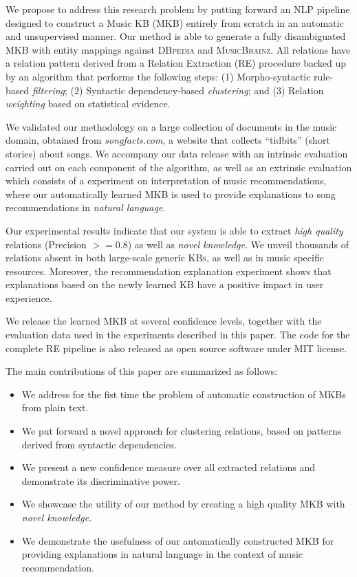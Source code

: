 We propose to address this research problem by putting forward an NLP pipeline designed to construct a Music KB (\textsc{MKB}) entirely from scratch in an automatic and unsupervised manner. Our method is able to generate a fully disambiguated \textsc{MKB} with entity mappings against \textsc{DBpedia} and \textsc{MusicBrainz}. All relations have a relation pattern derived from a Relation Extraction (\textsc{RE}) procedure backed up by an algorithm that performs the following steps: (1) Morpho-syntactic rule-based \textit{filtering}; (2) Syntactic dependency-based \textit{clustering}; and (3) Relation \textit{weighting} based on statistical evidence. 

We validated our methodology on a large collection of documents in the music domain, obtained from \textit{songfacts.com}, a website that collects ``tidbits'' (short stories) about songs.
We accompany our data release with an intrinsic evaluation carried out on each component of the algorithm, as well as an extrinsic evaluation which consists of a experiment on interpretation of music recommendations, where our automatically learned \textsc{MKB} is used to provide explanations to song recommendations in \textit{natural language}.

Our experimental results indicate that our system is able to extract \textit{high quality} relations (Precision $>= 0.8$) as well as \textit{novel knowledge}. We unveil thousands of relations absent in both large-scale generic \textsc{KBs}, as well as in music specific resources. Moreover, the recommendation explanation experiment shows that explanations based on the newly learned \textsc{KB} have a positive impact in user experience.

We release the learned \textsc{MKB} at several confidence levels, together with the evaluation data used in the experiments described in this paper. The code for the complete \textsc{RE} pipeline is also released as open source software under MIT license.

The main contributions of this paper are summarized as follows:
\begin{itemize}
    \item{We address for the fist time the problem of automatic construction of MKBs from plain text.}
    \item{We put forward a novel approach for clustering relations, based on patterns derived from syntactic dependencies.}
    \item{We present a new confidence measure over all extracted relations and demonstrate its discriminative power.}
    \item{We showcase the utility of our method by creating a high quality MKB with \textit{novel knowledge}.}
    \item{We demonstrate the usefulness of our automatically constructed MKB for providing explanations in natural language in the context of music recommendation.}
\end{itemize}

